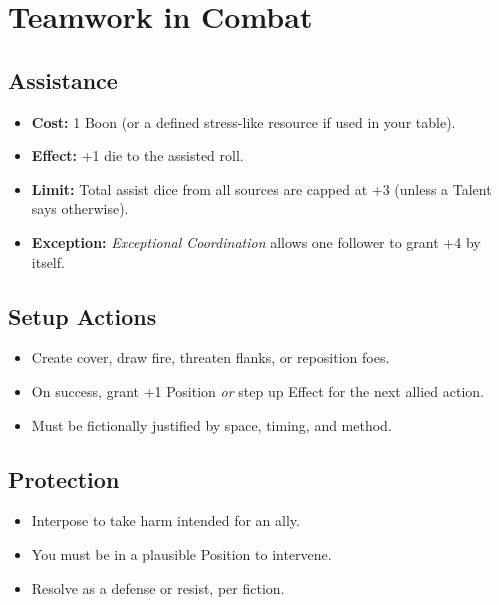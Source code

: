 \section{Teamwork in Combat}
\label{sec:teamwork}

\subsection{Assistance}
\label{subsec:assistance}

\begin{itemize}
  \item \textbf{Cost:} 1 Boon (or a defined stress-like resource if used in your table). 
  \item \textbf{Effect:} +1 die to the assisted roll.
  \item \textbf{Limit:} Total assist dice from all sources are capped at +3 (unless a Talent says otherwise).
  \item \textbf{Exception:} \emph{Exceptional Coordination} allows one follower to grant +4 by itself.
\end{itemize}

\subsection{Setup Actions}
\label{subsec:setup-actions}

\begin{itemize}
  \item Create cover, draw fire, threaten flanks, or reposition foes.
  \item On success, grant +1 Position \emph{or} step up Effect for the next allied action.
  \item Must be fictionally justified by space, timing, and method.
\end{itemize}

\subsection{Protection}
\label{subsec:protection}

\begin{itemize}
  \item Interpose to take harm intended for an ally.
  \item You must be in a plausible Position to intervene.
  \item Resolve as a defense or resist, per fiction.
\end{itemize}

